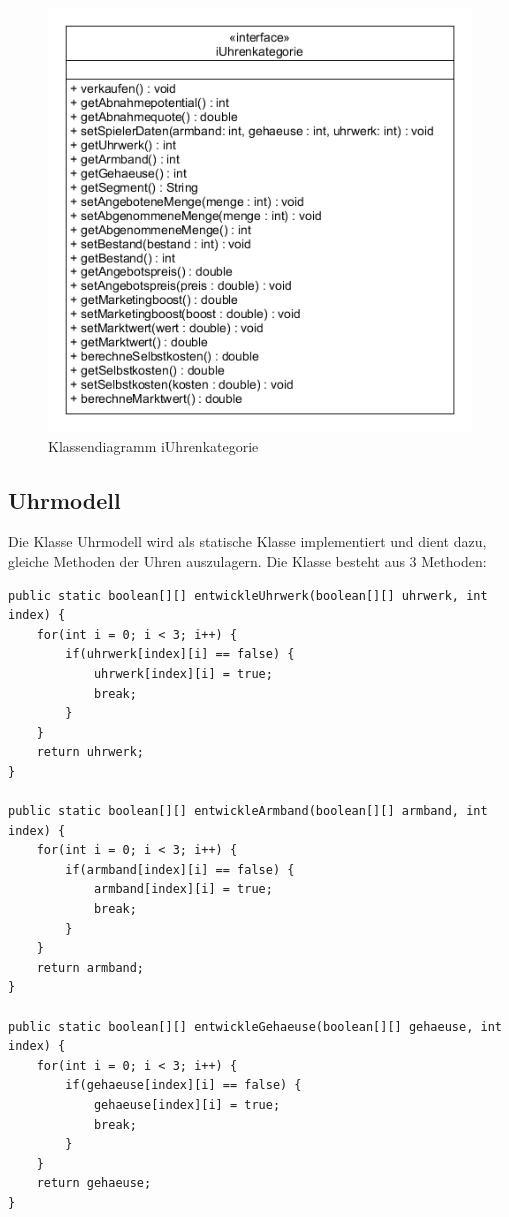 \begin{figure}[!h]
	\centering
	\includegraphics[scale=0.7]{img/iUhrenkategorie.png} 
	\caption{Klassendiagramm iUhrenkategorie} \label{fig:abb3}
\end{figure}

\subsection{Uhrmodell}
Die Klasse Uhrmodell wird als statische Klasse implementiert und dient dazu, gleiche Methoden der Uhren auszulagern. Die Klasse besteht aus 3 Methoden: 

\lstset{language=Java}
\begin{lstlisting}
public static boolean[][] entwickleUhrwerk(boolean[][] uhrwerk, int index) {
	for(int i = 0; i < 3; i++) {
		if(uhrwerk[index][i] == false) {
			uhrwerk[index][i] = true;
			break;
		}
	}
	return uhrwerk;
}

public static boolean[][] entwickleArmband(boolean[][] armband, int index) {
	for(int i = 0; i < 3; i++) {
		if(armband[index][i] == false) {
			armband[index][i] = true;
			break;
		}
	}
	return armband;
}

public static boolean[][] entwickleGehaeuse(boolean[][] gehaeuse, int index) {
	for(int i = 0; i < 3; i++) {
		if(gehaeuse[index][i] == false) {
			gehaeuse[index][i] = true;
			break;
		}
	}
	return gehaeuse;
}	
\end{lstlisting}

